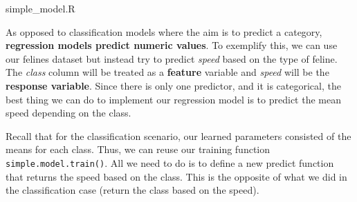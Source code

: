 \documentclass[
  11pt,
]{krantz}
\makeatletter
\newenvironment{Shaded}{\begin{snugshade}}{\end{snugshade}}
\newcommand{\CommentTok}[1]{\textcolor[rgb]{0.37,0.37,0.37}{\textit{#1}}}
\newcommand{\ConstantTok}[1]{\textcolor[rgb]{0,0,0}{#1}}
\newcommand{\ControlFlowTok}[1]{\textcolor[rgb]{0.27,0.27,0.27}{\textbf{#1}}}
\newcommand{\DecValTok}[1]{\textcolor[rgb]{0.06,0.06,0.06}{#1}}
\newcommand{\FunctionTok}[1]{\textcolor[rgb]{0,0,0}{#1}}
\newcommand{\NormalTok}[1]{#1}
\newcommand{\OtherTok}[1]{\textcolor[rgb]{0.37,0.37,0.37}{#1}}
\newcommand{\SpecialCharTok}[1]{\textcolor[rgb]{0,0,0}{#1}}
\newenvironment{kframe}{%
\medskip{}
\setlength{\fboxsep}{.8em}
 \def\at@end@of@kframe{}%
 \ifinner\ifhmode%
  \def\at@end@of@kframe{\end{minipage}}%
  \begin{minipage}{\columnwidth}%
 \fi\fi%
 \def\FrameCommand##1{\hskip\@totalleftmargin \hskip-\fboxsep
 \colorbox{shadecolor}{##1}\hskip-\fboxsep
     \hskip-\linewidth \hskip-\@totalleftmargin \hskip\columnwidth}%
 \MakeFramed {\advance\hsize-\width
   \@totalleftmargin\z@ \linewidth\hsize
   \@setminipage}}%
 {\par\unskip\endMakeFramed%
 \at@end@of@kframe}
\newenvironment{rmdblock}[1]
  {
  \begin{itemize}
  \renewcommand{\labelitemi}{
    \raisebox{-.7\height}[0pt][0pt]{
      {\setkeys{Gin}{width=3em,keepaspectratio}\texttt{[image: images/icons/\#1]}}
    }
  }
  \setlength{\fboxsep}{1em}
  \begin{kframe}
  \item
  }
  {
  \end{kframe}
  \end{itemize}
  }
\newenvironment{rmdfolder}
  {\begin{rmdblock}{folder}}
  {\end{rmdblock}}
\makeatother
\begin{document}
\begin{rmdfolder}
simple\_model.R
\end{rmdfolder}

As opposed to classification models where the aim is to predict a category, \textbf{regression models predict numeric values}. To exemplify this, we can use our felines dataset but instead try to predict \emph{speed} based on the type of feline. The \emph{class} column will be treated as a \textbf{feature} variable and \emph{speed} will be the \textbf{response variable}. Since there is only one predictor, and it is categorical, the best thing we can do to implement our regression model is to predict the mean speed depending on the class.

Recall that for the classification scenario, our learned parameters consisted of the means for each class. Thus, we can reuse our training function \texttt{simple.model.train()}. All we need to do is to define a new predict function that returns the speed based on the class. This is the opposite of what we did in the classification case (return the class based on the speed).

\begin{Shaded}
\end{Shaded}
\end{document}
